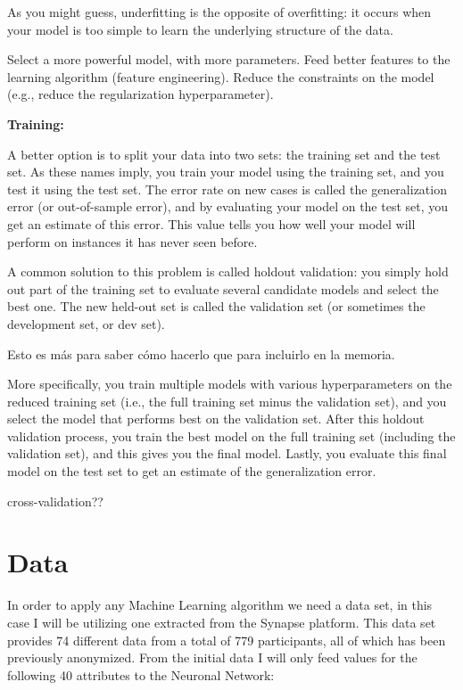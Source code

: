 \documentclass[12pt, a4paper]{article}
\begin{document}
	As you might guess, underfitting is the opposite of overfitting: it occurs when your model is too simple to learn the underlying structure of the data.
	
	Select a more powerful model, with more parameters.
	Feed better features to the learning algorithm (feature engineering).
	Reduce the constraints on the model (e.g., reduce the regularization hyperparameter).
	
	\textbf{Training:}
	
	A better option is to split your data into two sets: the training set and the test set. As these names imply, you train your model using the training set, and you test it using the test set. The error rate on new cases is called the generalization error (or out-of-sample error), and by evaluating your model on the test set, you get an estimate of this error. This value tells you how well your model will perform on instances it has never seen before.
	
	A common solution to this problem is called holdout validation: you simply hold out part of the training set to evaluate several candidate models and select the best one. The new held-out set is called the validation set (or sometimes the development set, or dev set).
	
	Esto es más para saber cómo hacerlo que para incluirlo en la memoria.
	
	More specifically, you train multiple models with various hyperparameters on the reduced training set (i.e., the full training set minus the validation set), and you select the model that performs best on the validation set. After this holdout validation process, you train the best model on the full training set (including the validation set), and this gives you the final model. Lastly, you evaluate this final model on the test set to get an estimate of the generalization error.
	
	cross-validation?? 
	
	
	\clearpage
	
	\section{Data}
	
	In order to apply any Machine Learning algorithm we need a data set, in this case I will be utilizing one extracted from the Synapse platform. This data set provides 74 different data from a total of 779 participants, all of which has been previously anonymized. From the initial data I will only feed values for the following 40 attributes to the Neuronal Network:
	
\end{document}
